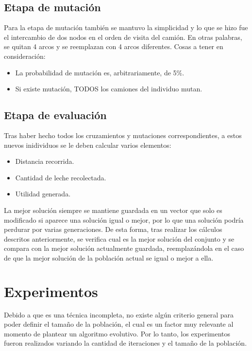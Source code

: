 \documentclass[letter, 10pt]{article}
\begin{document}
\subsection{Etapa de mutación}

Para la etapa de mutación también se mantuvo la simplicidad y lo que se hizo fue el intercambio de dos nodos en el orden de visita del camión. En otras palabras, se quitan 4 arcos y se reemplazan con 4 arcos diferentes. Cosas a tener en consideración:

\begin{itemize}
    \item La probabilidad de mutación es, arbitrariamente, de 5\%.
    \item Si existe mutación, TODOS los camiones del individuo mutan.
\end{itemize}

\subsection{Etapa de evaluación}

Tras haber hecho todos los cruzamientos y mutaciones correspondientes, a estos nuevos inidividuos se le deben calcular varios elementos:

\begin{itemize}
    \item Distancia recorrida.
    \item Cantidad de leche recolectada.
    \item Utilidad generada.
\end{itemize}

La mejor solución siempre se mantiene guardada en un vector que solo es modificado si aparece una solución igual o mejor, por lo que una solución podría perdurar por varias generaciones. De esta forma, tras realizar los cálculos descritos anteriormente, se verifica cual es la mejor solución del conjunto y se compara con la mejor solución actualmente guardada, reemplazándola en el caso de que la mejor solución de la población actual se igual o mejor a ella.

\section{Experimentos}

Debido a que es una técnica incompleta, no existe algún criterio general para poder definir el tamaño de la población, el cual es un factor muy relevante al momento de plantear un algoritmo evolutivo. Por lo tanto, los experimentos fueron realizados variando la cantidad de iteraciones y el tamaño de la población. \\
\end{document}
